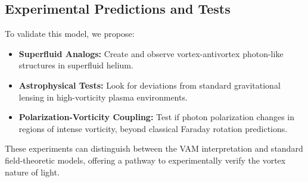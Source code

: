 \subsection{Experimental Predictions and Tests}
To validate this model, we propose:
\begin{itemize}
    \item \textbf{Superfluid Analogs:} Create and observe vortex-antivortex photon-like structures in superfluid helium.
    \item \textbf{Astrophysical Tests:} Look for deviations from standard gravitational lensing in high-vorticity plasma environments.
    \item \textbf{Polarization-Vorticity Coupling:} Test if photon polarization changes in regions of intense vorticity, beyond classical Faraday rotation predictions.
\end{itemize}

These experiments can distinguish between the VAM interpretation and standard field-theoretic models, offering a pathway to experimentally verify the vortex nature of light.
